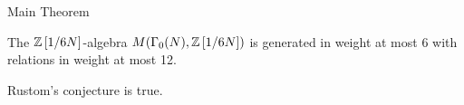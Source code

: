 \begin{frame}{Main Theorem}

  \begin{conjecture}[Rustom]
The $\mathbb{Z}\left[1/6N\right]$-algebra $M(\Gamma_0(N), \mathbb{Z}\left[1/6N\right])$ is generated in weight at most 6 with relations in weight at most 12.    
  \end{conjecture}


  \begin{theorem}[Voight, ZB]
    Rustom's conjecture is true.      
  \end{theorem}







\end{frame}
